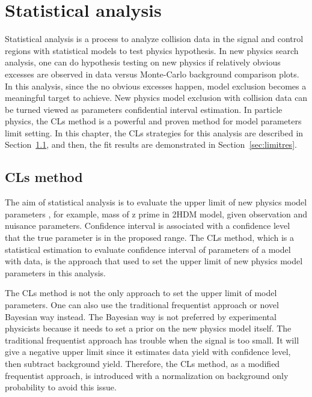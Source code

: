 \chapter{Statistical analysis}
\label{ch:stat-ana}

\par Statistical analysis is a process to analyze collision data in the signal and control regions with statistical models to test physics hypothesis. 
In new physics search analysis, one can do hypothesis testing on new physics if relatively obvious excesses are observed in data versus Monte-Carlo background comparison plots. 
In this analysis, since the no obvious excesses happen, model exclusion becomes a meaningful target to achieve. 
New physics model exclusion with collision data can be turned viewed as parameters confidential interval estimation. 
In particle physics, the CLs method\cite{Read:2002hq} is a powerful and proven method for model parameters limit setting. 
In this chapter, the CLs strategies for this analysis are described in Section~\ref{sec:cls}, and then, the fit results are demonstrated in Section~\ref{sec:limitres}. 

\section{CLs method}
\label{sec:cls}

\par The aim of statistical analysis is to evaluate the upper limit of new physics model parameters , for example, mass of z prime in 2HDM model, given observation and nuisance parameters. 
Confidence interval is associated with a confidence level that the true parameter is in the proposed range. 
The CLs method, which is a statistical estimation to evaluate confidence interval of parameters of a model with data, is the approach that used to set the upper limit of new physics model parameters in this analysis.

\par The CLs method is not the only approach to set the upper limit of model parameters. 
One can also use the traditional frequentist approach or novel Bayesian way instead. 
The Bayesian way is not preferred by experimental physicists because it needs to set a prior on the new physics model itself.
The traditional frequentist approach has trouble when the signal is too small. 
It will give a negative upper limit since it estimates data yield with confidence level, then subtract background yield.
Therefore, the CLs method, as a modified frequentist approach, is introduced with a normalization on background only probability to avoid this issue.

